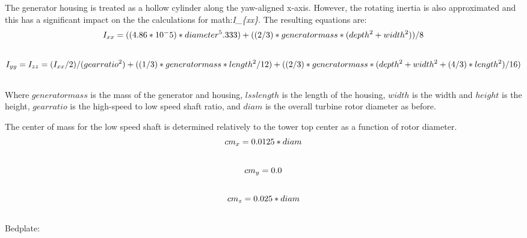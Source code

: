 \documentclass[letterpaper,10pt,openany,oneside]{sphinxmanual}
\begin{document}
The generator housing is treated as a hollow cylinder along the yaw-aligned x-axis.  However, the rotating inertia is also approximated and this has a significant impact on the the calculations for math:\emph{I\_\{xx\}}.  The resulting equations are:
\begin{gather}
\begin{split}I_{xx}=((4.86 * 10^-5) * diameter^5.333) + ((2/3) * generatormass * (depth^2 + width^2))/8\end{split}\notag\\\begin{split}\end{split}\notag
\end{gather}\begin{gather}
\begin{split}I_{yy}=I_{zz}= (I_{xx}/2)/(gearratio^2) + ((1/3) * generatormass * length^2 / 12) + ((2/3) * generatormass * (depth^ 2 + width^2 + (4/3)*length^2) / 16)\end{split}\notag\\\begin{split}\end{split}\notag
\end{gather}
Where $generatormass$ is the mass of the generator and housing, $lsslength$ is the length of the housing, $width$ is the width and $height$ is the height, $gearratio$ is the high-speed to low speed shaft ratio, and $diam$ is the overall turbine rotor diameter as before.

The center of mass for the low speed shaft is determined relatively to the tower top center as a function of rotor diameter.
\begin{gather}
\begin{split}cm_{x} = 0.0125 * diam\end{split}\notag\\\begin{split}\end{split}\notag
\end{gather}\begin{gather}
\begin{split}cm_{y} = 0.0\end{split}\notag\\\begin{split}\end{split}\notag
\end{gather}\begin{gather}
\begin{split}cm_{z} = 0.025 * diam\end{split}\notag\\\begin{split}\end{split}\notag
\end{gather}
Bedplate:
\end{document}
